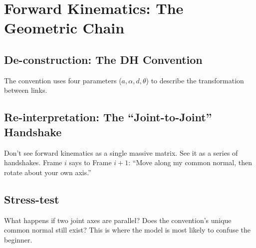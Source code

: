 \chapter{Forward Kinematics: The Geometric Chain}

\section{De-construction: The DH Convention}
The  convention uses four parameters (\(a, \alpha, d, \theta\)) to describe the transformation between links.

\section{Re-interpretation: The ``Joint-to-Joint'' Handshake}
\begin{designrule}
    Don't see forward kinematics as a single massive matrix. See it as a series of handshakes. Frame \(i\) says to Frame \(i+1\): ``Move along my common normal, then rotate about your own axis.''
\end{designrule}

\section{Stress-test}
\begin{reflectionbox}
    What happens if two joint axes are parallel? Does the  convention's unique common normal still exist? This is where the model is most likely to confuse the beginner.
\end{reflectionbox}
